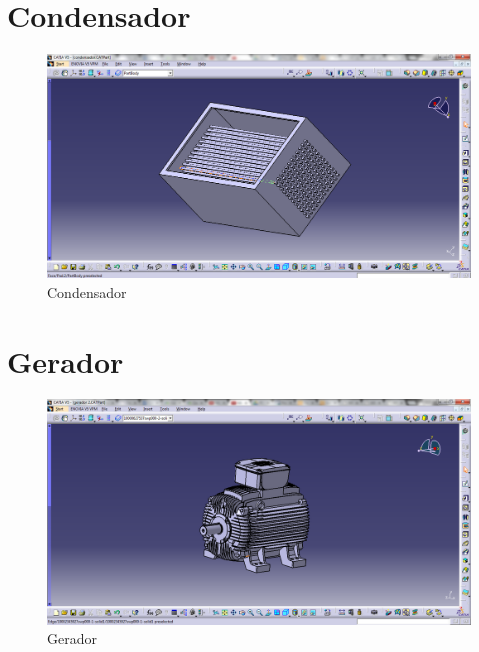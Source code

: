 \section{Condensador}
\begin{figure}[!htbp]
	  \centering
	  \includegraphics[scale=0.45]{editaveis/figuras/C_condensador}
	  \caption[Condensador]{Condensador}
	  \label{Condensador}
	\end{figure}
	\FloatBarrier

\section{Gerador}
	\begin{figure}[!htbp]
	  \centering
	  \includegraphics[scale=0.45]{editaveis/figuras/C_Gerador}
	  \caption[Gerador]{Gerador}
	  \label{Gerador}
	\end{figure}
	\FloatBarrier

